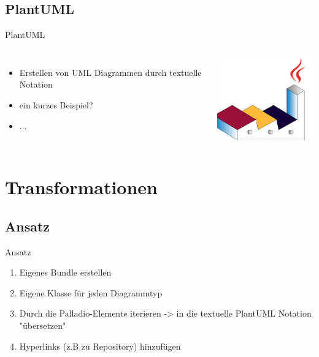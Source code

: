 \documentclass{sdqbeamer}
\begin{document}
\subsection{PlantUML}
\begin{frame}{PlantUML}
\begin{columns}
\begin{itemize}
\item Erstellen von UML Diagrammen durch textuelle Notation
\item ein kurzes Beispiel?
\item ...
\end{itemize}
\includegraphics[width=\textwidth]{plantuml.jpg}
\end{columns}
\end{frame}

\section{Transformationen}
\subsection{Ansatz}
\begin{frame}{Ansatz}
\begin{enumerate}
\item Eigenes Bundle erstellen
\item Eigene Klasse für jeden Diagrammtyp
\item Durch die Palladio-Elemente iterieren -> in die textuelle PlantUML Notation "übersetzen"
\item Hyperlinks (z.B zu Repository) hinzufügen
\end{enumerate}
\end{frame}
\end{document}
